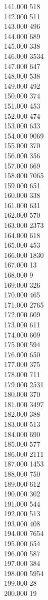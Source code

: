 { 141.000	518 \\
 142.000	511 \\
 143.000	496 \\
 144.000	689 \\
 145.000	338 \\
 146.000	3534 \\
 147.000	647 \\
 148.000	538 \\
 149.000	492 \\
 150.000	374 \\
 151.000	453 \\
 152.000	474 \\
 153.000	633 \\
 154.000	9069 \\
 155.000	370 \\
 156.000	356 \\
 157.000	669 \\
 158.000	7065 \\
 159.000	651 \\
 160.000	338 \\
 161.000	631 \\
 162.000	570 \\
 163.000	2373 \\
 164.000	618 \\
 165.000	453 \\
 166.000	1830 \\
 167.000	13 \\
 168.000	9 \\
 169.000	326 \\
 170.000	465 \\
 171.000	2765 \\
 172.000	609 \\
 173.000	611 \\
 174.000	609 \\
 175.000	594 \\
 176.000	650 \\
 177.000	375 \\
 178.000	711 \\
 179.000	2531 \\
 180.000	370 \\
 181.000	3497 \\
 182.000	388 \\
 183.000	513 \\
 184.000	690 \\
 185.000	577 \\
 186.000	2111 \\
 187.000	1453 \\
 188.000	750 \\
 189.000	612 \\
 190.000	302 \\
 191.000	544 \\
 192.000	513 \\
 193.000	408 \\
 194.000	7654 \\
 195.000	654 \\
 196.000	587 \\
 197.000	384 \\
 198.000	5954 \\
 199.000	28 \\
 200.000	19 \\
}
